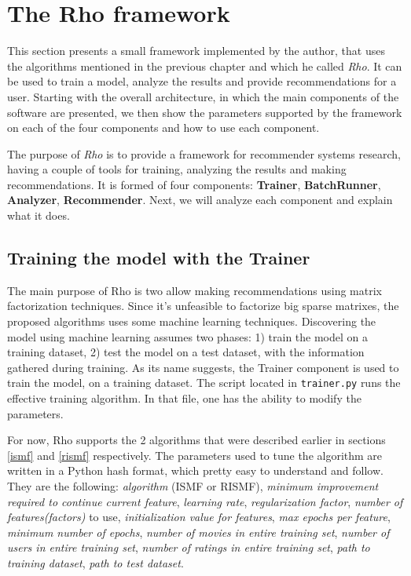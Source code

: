 \documentclass[10pt,a4paper]{article}  %
\begin{document}
\section{The Rho framework}
\label{sec:rho}

This section presents a small framework implemented by the author, that uses the algorithms mentioned in the previous chapter and which he called \emph{Rho}. It can be used to train a model, analyze the results and provide recommendations for a user. Starting with the overall architecture, in which the main components of the software are presented, we then show the parameters supported by the framework on each of the four components and how to use each component.

The purpose of \emph{Rho} is to provide a framework for recommender systems research, having a couple of tools for training, analyzing the results and making recommendations. It is formed of four components: \textbf{Trainer}, \textbf{BatchRunner}, \textbf{Analyzer}, \textbf{Recommender}. Next, we will analyze each component and explain what it does. 

\subsection{Training the model with the \textbf{Trainer}}
\label{trainer}

The main purpose of Rho is two allow making recommendations using matrix factorization techniques. Since it's unfeasible to factorize big sparse matrixes, the proposed algorithms uses some machine learning techniques. Discovering the model using machine learning assumes two phases: 1) train the model on a training dataset, 2) test the model on a test dataset, with the information gathered during training. As its name suggests, the Trainer component is used to train the model, on a training dataset. The script located in \texttt{trainer.py} runs the effective training algorithm. In that file, one has the ability to modify the parameters.

For now, Rho supports the 2 algorithms that were described earlier in sections \ref{ismf} and \ref{rismf} respectively. The parameters used to tune the algorithm are written in a Python hash format, which pretty easy to understand and follow. They are the following:
\emph{algorithm} (ISMF or RISMF), \emph{minimum improvement required to continue current feature}, \emph{learning rate}, \emph{regularization factor}, \emph{number of features(factors)} to use, \emph{initialization value for features}, \emph{max epochs per feature}, \emph{minimum number of epochs}, \emph{number of movies in entire training set}, \emph{number of users in entire training set}, \emph{number of ratings in entire training set}, \emph{path to training dataset}, \emph{path to test dataset}.
\end{document}
